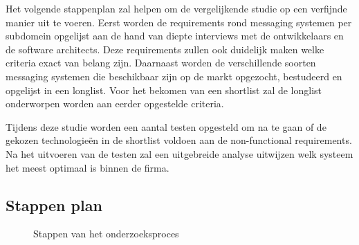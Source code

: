 


Het volgende stappenplan zal helpen om de vergelijkende studie op een verfijnde manier uit te voeren.
Eerst worden de requirements rond messaging systemen per subdomein opgelijst aan de hand van diepte interviews 
met de ontwikkelaars en de software architects. 
Deze requirements zullen ook duidelijk maken welke criteria exact van belang zijn.
Daarnaast worden de verschillende soorten messaging systemen die beschikbaar zijn op de markt opgezocht, bestudeerd en opgelijst in een longlist.
Voor het bekomen van een shortlist zal de longlist onderworpen worden aan eerder opgestelde criteria.
\newline

Tijdens deze studie worden een aantal testen opgesteld om na te gaan of de gekozen technologieën in de shortlist voldoen aan de non-functional requirements.
Na het uitvoeren van de testen zal een uitgebreide analyse uitwijzen welk systeem het meest optimaal is binnen de firma.

\subsection{Stappen plan}

\begin{figure}[htbp]
  \centering
  \caption{Stappen van het onderzoeksproces}
  \label{fig:flowchart}
\end{figure}


